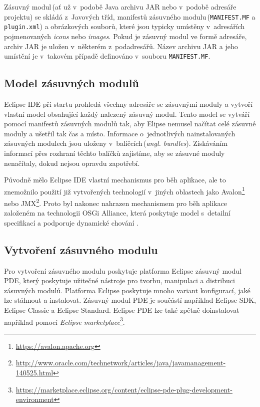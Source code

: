   Zásuvný modul\,(ať už v~podobě Java archivu JAR nebo v~podobě adresáře projektu) se skládá z~Javových tříd, manifestů zásuvného modulu\,(\texttt{MANIFEST.MF} a \texttt{plugin.xml}) a obrázkových souborů, které jsou typicky umístěny v~adresářích pojmenovaných \emph{icons} nebo \emph{images}. Pokud je zásuvný modul ve formě adresáře, archiv JAR je uložen v~některém z~podadresářů. Název archivu JAR a jeho umístění je v~takovém případě definováno v~souboru \texttt{MANIFEST.MF}.

    \subsection{Model zásuvných modulů}
    Eclipse IDE při startu prohledá všechny adresáře se zásuvnými moduly a vytvoří vlastní model obsahující každý nalezený zásuvný modul. Tento model se vytváří pomocí manifestů zásuvných modulů tak, aby Elipse nemusel načítat celé zásuvné moduly a ušetřil tak čas a místo. Informace o~jednotlivých nainstalovaných zásuvných modulech jsou uloženy v~balíčcích\,(\emph{angl. bundles}). Získáváním informací přes rozhraní těchto balíčků zajistíme, aby se zásuvné moduly nenačítaly, dokud nejsou opravdu zapotřebí.

    Původně mělo Eclipse IDE vlastní mechanismus pro běh aplikace, ale to znemožnilo použití již vytvořených technologií v~jiných oblastech jako Avalon\footnote{\url{https://avalon.apache.org}} nebo JMX\footnote{\url{http://www.oracle.com/technetwork/articles/java/javamanagement-140525.html}}. Proto byl nakonec nahrazen mechanismem pro běh aplikace založeném na technologii OSGi Alliance, která poskytuje model s~detailní specifikací a podporuje dynamické chování \cite{Plugins}.

    \subsection{Vytvoření zásuvného modulu}
    Pro vytvoření zásuvného modulu poskytuje platforma Eclipse zásuvný modul PDE, který poskytuje užitečné nástroje pro tvorbu, manipulaci a distribuci zásuvných modulů. Platforma Eclipse poskytuje mnoho variant konfigurací, jaké lze stáhnout a instalovat. Zásuvný modul PDE je součástí například Eclipse SDK, Eclipse Classic a Eclipse Standard. Eclipse PDE lze také zpětně doinstalovat například pomocí \emph{Eclipse marketplace}\footnote{\url{https://marketplace.eclipse.org/content/eclipse-pde-plug-development-environment}}.

